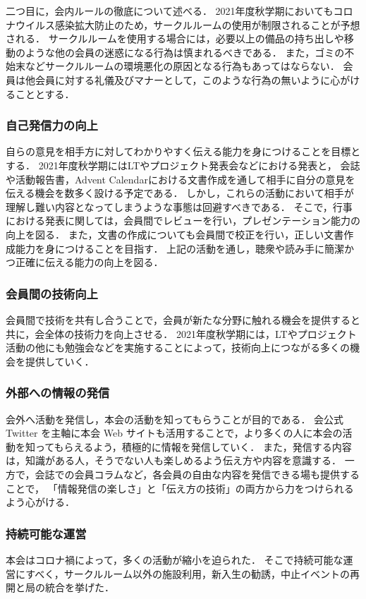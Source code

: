     二つ目に，会内ルールの徹底について述べる．
    2021年度秋学期においてもコロナウイルス感染拡大防止のため，サークルルームの使用が制限されることが予想される．
    サークルルームを使用する場合には，必要以上の備品の持ち出しや移動のような他の会員の迷惑になる行為は慎まれるべきである．
    また，ゴミの不始末などサークルルームの環境悪化の原因となる行為もあってはならない．
    会員は他会員に対する礼儀及びマナーとして，このような行為の無いように心がけることとする．

\subsubsection*{自己発信力の向上}
    自らの意見を相手方に対してわかりやすく伝える能力を身につけることを目標とする．
    2021年度秋学期にはLTやプロジェクト発表会などにおける発表と，
    会誌や活動報告書，Advent Calendarにおける文書作成を通して相手に自分の意見を伝える機会を数多く設ける予定である．
    しかし，これらの活動において相手が理解し難い内容となってしまうような事態は回避すべきである．
    そこで，行事における発表に関しては，会員間でレビューを行い，プレゼンテーション能力の向上を図る．
    また，文書の作成についても会員間で校正を行い，正しい文書作成能力を身につけることを目指す．
    上記の活動を通し，聴衆や読み手に簡潔かつ正確に伝える能力の向上を図る．

\subsubsection*{会員間の技術向上}
    会員間で技術を共有し合うことで，会員が新たな分野に触れる機会を提供すると共に，会全体の技術力を向上させる．
    2021年度秋学期には，LTやプロジェクト活動の他にも勉強会などを実施することによって，技術向上につながる多くの機会を提供していく．

\subsubsection*{外部への情報の発信}
    会外へ活動を発信し，本会の活動を知ってもらうことが目的である．
    会公式 Twitter を主軸に本会 Web サイトも活用することで，より多くの人に本会の活動を知ってもらえるよう，積極的に情報を発信していく．
    また，発信する内容は，知識がある人，そうでない人も楽しめるよう伝え方や内容を意識する．
    一方で，会誌での会員コラムなど，各会員の自由な内容を発信できる場も提供することで，
    「情報発信の楽しさ」と「伝え方の技術」の両方から力をつけられるよう心がける．
    
\subsubsection*{持続可能な運営}
    本会はコロナ禍によって，多くの活動が縮小を迫られた．
    そこで持続可能な運営にすべく，サークルルーム以外の施設利用，新入生の勧誘，中止イベントの再開と局の統合を挙げた．
    
